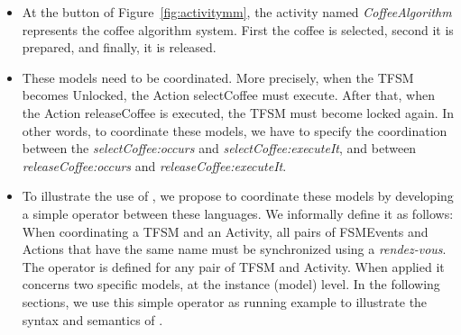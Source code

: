\begin{itemize}
	\item At the button of Figure~\ref{fig:activitymm}, the activity named \emph{CoffeeAlgorithm} represents the coffee algorithm system. First the coffee is selected, second it is prepared, and finally, it is released.    
	
	\item These models need to be coordinated. More precisely, when the TFSM becomes Unlocked, the Action selectCoffee must execute. After that, when the Action releaseCoffee is executed, the TFSM must become locked again. In other words, to coordinate these models, we have to specify the coordination between the \mse \emph{selectCoffee:occurs} and \emph{selectCoffee:executeIt}, and  between \emph{releaseCoffee:occurs} and \emph{releaseCoffee:executeIt}.
	
	\item To illustrate the use of \bcool, we propose to coordinate these models by developing a simple \bcool operator between these languages. We informally define it as follows: When coordinating a TFSM and an Activity, all pairs of FSMEvents and Actions that have the same name must be synchronized using a \emph{rendez-vous}. The operator is defined for any pair of TFSM and Activity. When applied it concerns two specific models, at the instance (model) level.  In the following sections, we use this simple operator as running example to illustrate the syntax and semantics of \bcool.  	
\end{itemize}






